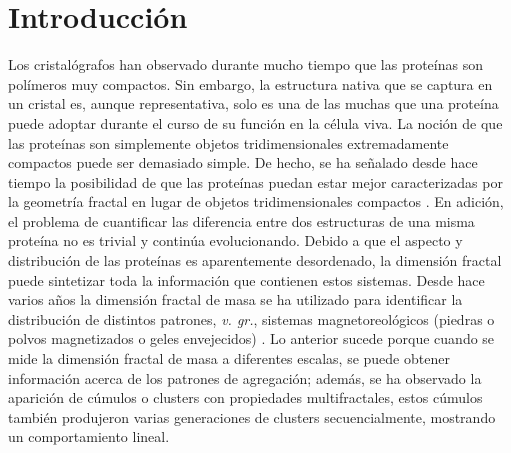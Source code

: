 \documentclass[11pt]{article}
\begin{document}
\clearpage

\section{Introducci\'{o}n}

Los cristal\'{o}grafos han observado durante mucho tiempo que las prote\'{i}nas son pol\'{i}meros muy compactos. Sin embargo, la estructura nativa que se captura en un cristal es, aunque representativa, solo es una de las muchas que una prote\'{i}na puede adoptar durante el curso de su funci\'{o}n en la c\'{e}lula viva. La noci\'{o}n de que las prote\'{i}nas son simplemente objetos tridimensionales extremadamente compactos puede ser demasiado simple. De hecho, se ha señalado desde hace tiempo la posibilidad de que las prote\'{i}nas puedan estar mejor caracterizadas por la geometr\'{i}a fractal en lugar de objetos tridimensionales compactos \cite{Enright2005}.
En adici\'{o}n, el problema de cuantificar las diferencia entre dos estructuras de una misma prote\'{i}na no es trivial y contin\'{u}a evolucionando. Debido a que el aspecto y distribuci\'{o}n de las prote\'{i}nas es aparentemente desordenado, la dimensi\'{o}n fractal puede sintetizar toda la informaci\'{o}n que contienen estos sistemas. Desde hace varios años la dimensi\'{o}n fractal de masa se ha utilizado para identificar la distribuci\'{o}n de distintos patrones, \textit{v. gr.}, sistemas magnetoreol\'{o}gicos (piedras o polvos magnetizados o geles envejecidos) \cite{Carrillo2003}. Lo anterior sucede porque cuando se mide la dimensi\'{o}n fractal de masa a diferentes escalas, se puede obtener  informaci\'{o}n acerca de los patrones de agregaci\'{o}n; adem\'{a}s, se ha observado la aparici\'{o}n de c\'{u}mulos o clusters con propiedades multifractales, estos c\'{u}mulos tambi\'{e}n produjeron varias generaciones de clusters secuencialmente, mostrando un comportamiento lineal.
\end{document}
